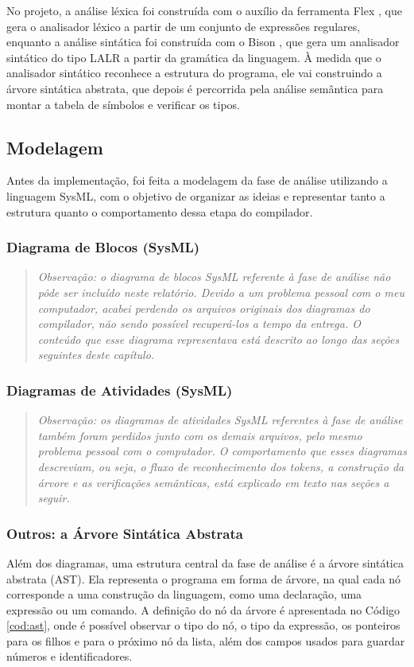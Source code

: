 \documentclass[
	12pt,				%
	oneside,
	a4paper,			%
	english,			%
	french,				%
	spanish,			%
	brazil,				%
	]{abntex2}
\begin{document}
No projeto, a análise léxica foi construída com o auxílio da ferramenta Flex \cite{flex_manual}, que gera o analisador léxico a partir de um conjunto de expressões regulares, enquanto a análise sintática foi construída com o Bison \cite{bison_manual}, que gera um analisador sintático do tipo LALR a partir da gramática da linguagem. À medida que o analisador sintático reconhece a estrutura do programa, ele vai construindo a árvore sintática abstrata, que depois é percorrida pela análise semântica para montar a tabela de símbolos e verificar os tipos.

\subsection{Modelagem}
Antes da implementação, foi feita a modelagem da fase de análise utilizando a linguagem SysML, com o objetivo de organizar as ideias e representar tanto a estrutura quanto o comportamento dessa etapa do compilador.

\subsubsection{Diagrama de Blocos (SysML)}
\begin{quote}
\textit{Observação: o diagrama de blocos SysML referente à fase de análise não pôde ser incluído neste relatório. Devido a um problema pessoal com o meu computador, acabei perdendo os arquivos originais dos diagramas do compilador, não sendo possível recuperá-los a tempo da entrega. O conteúdo que esse diagrama representava está descrito ao longo das seções seguintes deste capítulo.}
\end{quote}

\subsubsection{Diagramas de Atividades (SysML)}
\begin{quote}
\textit{Observação: os diagramas de atividades SysML referentes à fase de análise também foram perdidos junto com os demais arquivos, pelo mesmo problema pessoal com o computador. O comportamento que esses diagramas descreviam, ou seja, o fluxo de reconhecimento dos tokens, a construção da árvore e as verificações semânticas, está explicado em texto nas seções a seguir.}
\end{quote}

\subsubsection{Outros: a Árvore Sintática Abstrata}
Além dos diagramas, uma estrutura central da fase de análise é a árvore sintática abstrata (AST). Ela representa o programa em forma de árvore, na qual cada nó corresponde a uma construção da linguagem, como uma declaração, uma expressão ou um comando. A definição do nó da árvore é apresentada no Código \ref{cod:ast}, onde é possível observar o tipo do nó, o tipo da expressão, os ponteiros para os filhos e para o próximo nó da lista, além dos campos usados para guardar números e identificadores.
\end{document}
